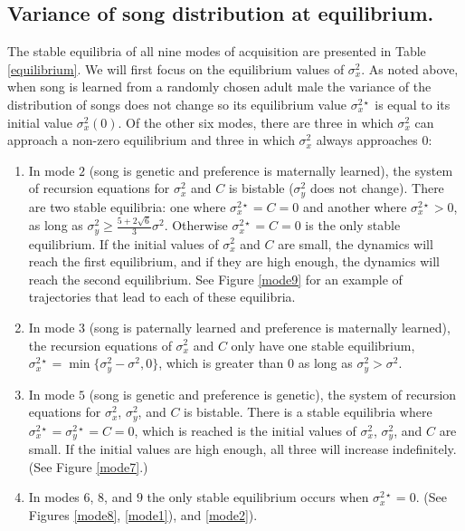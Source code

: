 \documentclass{article}
\begin{document}
\subsection*{Variance of song distribution at equilibrium. }
The stable equilibria of all nine modes of acquisition are presented in Table \ref{equilibrium}. We will first focus on the equilibrium values of $\sigma_x^2$. As noted above, when song is learned from a randomly chosen adult male the variance of the distribution of songs does not change so its equilibrium value $\sigma_x^{2\star}$ is equal to its initial value $\sigma_x^2(0)$. Of the other six modes, there are three in which $\sigma_x^2$ can approach a non-zero equilibrium and three in which $\sigma_x^2$ always approaches $0$:
\begin{enumerate}
\item
In mode $2$ (song is genetic and preference is maternally learned), the system of recursion equations for $\sigma_x^2$ and $C$ is bistable ($\sigma_y^2$ does not change). There are two stable equilibria: one where $\sigma_x^{2\star}=C=0$ and another where $\sigma_x^{2\star}>0$, as long as $\sigma_y^2\geq\frac{5+2\sqrt{6}}{3}\sigma^2$. Otherwise $\sigma_x^{2\star}=C=0$ is the only stable equilibrium. If the initial values of $\sigma_x^2$ and $C$ are small, the dynamics will reach the first equilibrium, and if they are high enough, the dynamics will reach the second equilibrium. See Figure \ref{mode9} for an example of trajectories that lead to each of these equilibria. 
\item In mode $3$ (song is paternally learned and preference is maternally learned), the recursion equations of $\sigma_x^2$ and $C$ only have one stable equilibrium, $\sigma_x^{2\star}=\min\{\sigma_y^2-\sigma^2,0\}$, which is greater than $0$ as long as $\sigma_y^2>\sigma^2$.
\item In mode $5$ (song is genetic and preference is genetic), the system of recursion equations for $\sigma_x^2$, $\sigma_y^2$, and $C$ is bistable. There is a stable equilibria where $\sigma_x^{2\star}=\sigma_y^{2\star}=C=0$, which is reached is the initial values of $\sigma_x^2$, $\sigma_y^2$, and $C$ are small. If the initial values are high enough, all three will increase indefinitely. (See Figure \ref{mode7}.)
\item In modes $6$, $8$, and $9$ the only stable equilibrium occurs when $\sigma_x^{2\star}=0$. (See Figures \ref{mode8}, \ref{mode1}), and \ref{mode2}). 
\end{enumerate}
\end{document}
